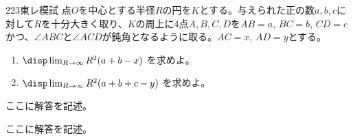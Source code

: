 \begin{thm}{223}{}{東レ模試}
 点$O$を中心とする半径$R$の円を$K$とする。与えられた正の数$a, b, c$に対して$R$を十分大きく取り、$K$の周上に4点$A, B, C, D$を$AB=a$, $BC=b$, $CD=c$かつ、$\angle{ABC}$と$\angle{ACD}$が鈍角となるように取る。$AC=x$, $AD=y$とする。
 \begin{enumerate}
  \item $\disp \lim_{R\to\infty} R^2(a+b-x)$ を求めよ。
  \item $\disp \lim_{R\to\infty} R^2(a+b+c-y)$ を求めよ。
 \end{enumerate}
\end{thm}

ここに解答を記述。

ここに解答を記述。